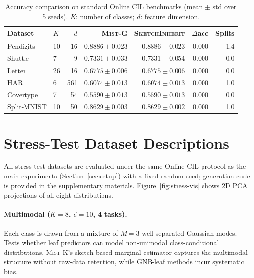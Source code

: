\documentclass{article}
\newcommand{\mist}{\textsc{Mist}}
\begin{document}
\begin{table}[h]
\centering
\caption{Accuracy comparison on standard Online CIL benchmarks
         (mean $\pm$ std over 5 seeds).
         $K$: number of classes; $d$: feature dimension.}
\label{tab:sketch-vs-gaussian-real}
\begin{tabular}{llrrrr r}
\toprule
Dataset & $K$ & $d$ & \mist{}-G & \textsc{SketchInherit} & $\Delta$acc & Splits \\
\midrule
Pendigits   & 10 & 16  & $0.8886\pm0.023$ & $0.8886\pm0.023$ & $0.000$  & 1.4 \\
Shuttle     & 7  & 9   & $0.7331\pm0.033$ & $0.7331\pm0.054$ & $0.000$  & 0.0 \\
Letter      & 26 & 16  & $0.6775\pm0.006$ & $0.6775\pm0.006$ & $0.000$  & 0.0 \\
HAR         & 6  & 561 & $0.6074\pm0.013$ & $0.6074\pm0.013$ & $0.000$  & 1.0 \\
Covertype   & 7  & 54  & $0.5590\pm0.013$ & $0.5590\pm0.013$ & $0.000$  & 0.0 \\
Split-MNIST & 10 & 50  & $0.8629\pm0.003$ & $0.8629\pm0.002$ & $0.000$  & 1.0 \\
\bottomrule
\end{tabular}
\end{table}


\section{Stress-Test Dataset Descriptions}
\label{app:stress}

All stress-test datasets are evaluated under the same Online CIL protocol
as the main experiments (Section~\ref{sec:setup}) with a fixed random seed; generation
code is provided in the supplementary materials.
Figure~\ref{fig:stress-vis} shows 2D PCA projections of all eight
distributions.

\paragraph{Multimodal ($K{=}8$, $d{=}10$, 4 tasks).}
Each class is drawn from a mixture of $M{=}3$ well-separated Gaussian modes.
Tests whether leaf predictors can model non-unimodal class-conditional
distributions. \mist{}-K's sketch-based marginal estimator captures the
multimodal structure without raw-data retention, while GNB-leaf methods
incur systematic bias.
\end{document}
